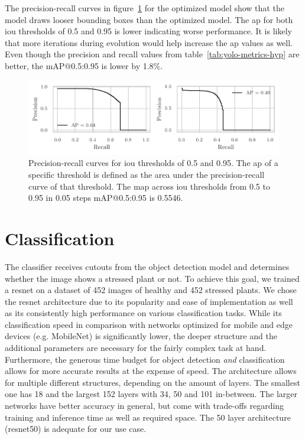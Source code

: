 \documentclass[draft,final]{vutinfth} %
\begin{document}
The precision-recall curves in figure~\ref{fig:yolo-ap-hyp} for the
optimized model show that the model draws looser bounding boxes than
the optimized model. The \gls{ap} for both \gls{iou} thresholds of 0.5
and 0.95 is lower indicating worse performance. It is likely that more
iterations during evolution would help increase the \gls{ap} values as
well. Even though the precision and recall values from
table~\ref{tab:yolo-metrics-hyp} are better, the \textsf{mAP}@0.5:0.95
is lower by 1.8\%.

\begin{figure}
  \centering
  \includegraphics{graphics/APpt5-pt95-final.pdf}
  \caption[Hyper-parameter optimized object detection AP@0.5 and
  AP@0.95.]{Precision-recall curves for \gls{iou} thresholds of 0.5
    and 0.95. The \gls{ap} of a specific threshold is defined as the
    area under the precision-recall curve of that threshold. The
    \gls{map} across \gls{iou} thresholds from 0.5 to 0.95 in 0.05
    steps \textsf{mAP}@0.5:0.95 is 0.5546.}
  \label{fig:yolo-ap-hyp}
\end{figure}

\section{Classification}
\label{sec:classifier-eval}

The classifier receives cutouts from the object detection model and
determines whether the image shows a stressed plant or not. To achieve
this goal, we trained a \gls{resnet} \cite{he2016} on a dataset of 452
images of healthy and 452 stressed plants. We chose the \gls{resnet}
architecture due to its popularity and ease of implementation as well
as its consistently high performance on various classification
tasks. While its classification speed in comparison with networks
optimized for mobile and edge devices (e.g. MobileNet) is
significantly lower, the deeper structure and the additional
parameters are necessary for the fairly complex task at
hand. Furthermore, the generous time budget for object detection
\emph{and} classification allows for more accurate results at the
expense of speed. The architecture allows for multiple different
structures, depending on the amount of layers. The smallest one has 18
and the largest 152 layers with 34, 50 and 101 in-between. The larger
networks have better accuracy in general, but come with trade-offs
regarding training and inference time as well as required space. The
50 layer architecture (\gls{resnet}50) is adequate for our use case.
\end{document}
